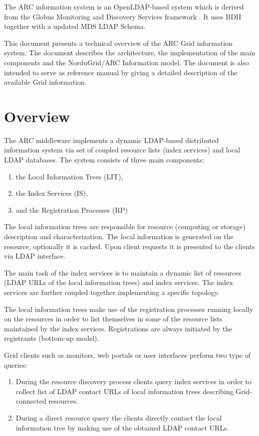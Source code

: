 \documentclass{article}
\begin{document}
The ARC information system is an OpenLDAP-based system\cite{Openldap}
which is derived from the Globus Monitoring and Discovery Services
framework \cite{mds}. It uses BDII\cite{bdii} together with a updated MDS LDAP Schema.


This document presents a technical overview of the ARC Grid information system. 
The document describes the architecture, the implementation of the main components 
and the NorduGrid/ARC Information model. The document is also intended to serve as  
reference manual by giving a detailed description of the available Grid information.


\section{Overview}

The ARC middleware implements a dynamic LDAP-based distributed information 
system via set of coupled resource lists (index services) and 
local LDAP databases. The system consists of three main components:
\begin{enumerate}
\item the Local Information Trees (LIT),
\item the Index Services  (IS),
\item and the Registration Processes (RP)
\end{enumerate}

The local information trees are responsible for resource (computing or storage)
description and characterization. The local information is generated on the 
resource, optionally it is cached. Upon client requests it is presented to the 
clients via LDAP interface.
 
The main task of the index services is to maintain a dynamic list of resources 
(LDAP URLs of the local information trees) and index services. 
The index services are further coupled together implementing a specific topology. 

The local information trees make use of the registration processes
running locally on the resources in order to list themselves in some of the 
resource lists maintained by the index services. Registrations are always 
initiated by the registrants (bottom-up model).

Grid clients such as monitors, web portals or user interfaces
perform two type of queries:
\begin{enumerate}
\item During the resource discovery process
clients query index services in order to collect list of LDAP contact 
URLs of local information trees describing Grid-connected resources. 


\item
During a direct resource query the clients directly contact the 
local information tree by making use of the obtained LDAP contact URLs.
\end{enumerate}
\end{document}
